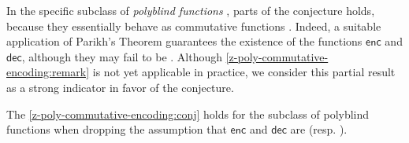 In the specific subclass of \emph{polyblind functions}
\cite{LENP21,DOUE22}, parts of the conjecture holds,
because they essentially behave as commutative functions \cite[Theorem
6.12]{DOUE23}. Indeed, a suitable application of Parikh's Theorem
\cite{PARI66} guarantees the existence of the functions $\mathsf{enc}$
and $\mathsf{dec}$, although they may fail to be  .
Although \cref{z-poly-commutative-encoding:remark} is not yet applicable in
practice, we consider this partial result as a strong indicator in favor of the
conjecture.

\begin{remark}
    \label{z-poly-commutative-encoding:remark}
    The \cref{z-poly-commutative-encoding:conj} holds for the
    subclass of polyblind functions when dropping the assumption that
    $\mathsf{enc}$ and $\mathsf{dec}$ are 
    (resp. ).
\end{remark}
